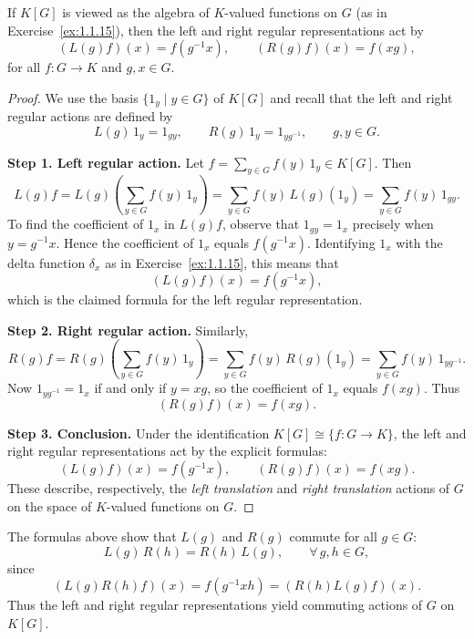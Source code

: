 \begin{exercise}[1.1.18]\label{ex:1.1.18}
If $K[G]$ is viewed as the algebra of $K$-valued functions on $G$
(as in Exercise~\ref{ex:1.1.15}),
then the left and right regular representations act by
\[
(L(g)f)(x)=f(g^{-1}x),
\qquad
(R(g)f)(x)=f(xg),
\]
for all $f:G\to K$ and $g,x\in G$.
\end{exercise}

\begin{proof}
We use the basis $\{1_y\mid y\in G\}$ of $K[G]$ and recall that the left and right regular actions are defined by
\[
L(g)\,1_y = 1_{gy},
\qquad
R(g)\,1_y = 1_{y g^{-1}},
\qquad g,y\in G.
\]

\smallskip
\noindent\textbf{Step 1. Left regular action.}
Let $f=\sum_{y\in G} f(y)\,1_y \in K[G]$.
Then
\[
L(g)f
   = L(g)\!\left(\sum_{y\in G} f(y)\,1_y\right)
   = \sum_{y\in G} f(y)\,L(g)(1_y)
   = \sum_{y\in G} f(y)\,1_{gy}.
\]
To find the coefficient of $1_x$ in $L(g)f$, observe that
$1_{gy}=1_x$ precisely when $y=g^{-1}x$.
Hence the coefficient of $1_x$ equals $f(g^{-1}x)$.
Identifying $1_x$ with the delta function $\delta_x$ as in
Exercise~\ref{ex:1.1.15}, this means that
\[
(L(g)f)(x) = f(g^{-1}x),
\]
which is the claimed formula for the left regular representation.

\smallskip
\noindent\textbf{Step 2. Right regular action.}
Similarly,
\[
R(g)f
   = R(g)\!\left(\sum_{y\in G} f(y)\,1_y\right)
   = \sum_{y\in G} f(y)\,R(g)(1_y)
   = \sum_{y\in G} f(y)\,1_{y g^{-1}}.
\]
Now $1_{y g^{-1}}=1_x$ if and only if $y=xg$,
so the coefficient of $1_x$ equals $f(xg)$.
Thus
\[
(R(g)f)(x) = f(xg).
\]

\smallskip
\noindent\textbf{Step 3. Conclusion.}
Under the identification $K[G]\cong\{f:G\to K\}$,
the left and right regular representations act by the explicit formulas:
\[
(L(g)f)(x)=f(g^{-1}x),
\qquad
(R(g)f)(x)=f(xg).
\]
These describe, respectively, the \emph{left translation} and \emph{right translation}
actions of $G$ on the space of $K$-valued functions on $G$.
\end{proof}

\begin{remark}
The formulas above show that $L(g)$ and $R(g)$ commute for all $g\in G$:
\[
L(g)\,R(h) = R(h)\,L(g), \qquad \forall\, g,h\in G,
\]
since
\[
(L(g)R(h)f)(x)=f(g^{-1}xh)=(R(h)L(g)f)(x).
\]
Thus the left and right regular representations yield commuting actions of $G$
on $K[G]$.
\end{remark}



